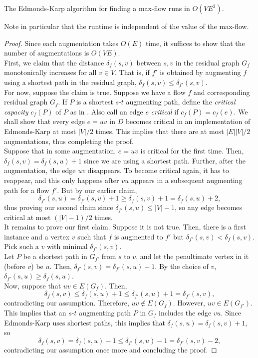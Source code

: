 			\begin{ftheo}
				The Edmonds-Karp algorithm for finding a max-flow runs in $O(VE^2)$.
			\end{ftheo}
			Note in particular that the runtime is independent of the value of the max-flow.
			\begin{proof}
				Since each augmentation takes $O(E)$ time, it suffices to show that the number of augmentations is $O(VE)$.\\
				First, we claim that the distance $\delta_f(s,v)$ between $s,v$ in the residual graph $G_f$ monotonically increases for all $v\in V$. That is, if $f'$ is obtained by augmenting $f$ using a shortest path in the residual graph, $\delta_f(s,v) \le \delta_{f'}(s,v)$.\\
				For now, suppose the claim is true. Suppose we have a flow $f$ and corresponding residual graph $G_f$. If $P$ is a shortest $s$-$t$ augmenting path, define the \emph{critical capacity} $c_f(P)$ of $P$ as in . Also call an edge $e$ \emph{critical} if $c_f(P) = c_f(e)$. We shall show that every edge $e = uv$ in $D$ becomes critical in an implementation of Edmonds-Karp at most $|V|/2$ times. This implies that there are at most $|E||V|/2$ augmentations, thus completing the proof.\\
				Suppose that in some augmentation, $e = uv$ is critical for the first time. Then, $\delta_f(s,v) = \delta_f(s,u) + 1$ since we are using a shortest path. Further, after the augmentation, the edge $uv$ disappears. To become critical again, it has to reappear, and this only happens after $vu$ appears in a subsequent augmenting path for a flow $f'$. But by our earlier claim,
				\[ \delta_{f'}(s,u) = \delta_{f'}(s,v) + 1 \ge \delta_f(s,v) + 1 = \delta_f(s,u) + 2, \]
				thus proving our second claim since $\delta_{f'}(s,u) \le |V|-1$, so any edge becomes critical at most $(|V|-1)/2$ times.\\

				It remains to prove our first claim. Suppose it is not true. Then, there is a first instance and a vertex $v$ such that $f$ is augmented to $f'$ but $\delta_{f'}(s,v) < \delta_{f}(s,v)$. Pick such a $v$ with minimal $\delta_{f'}(s,v)$.\\
				Let $P$ be a shortest path in $G_{f'}$ from $s$ to $v$, and let the penultimate vertex in it (before $v$) be $u$. Then, $\delta_{f'}(s,v) = \delta_{f'}(s,u) + 1$. By the choice of $v$, $\delta_{f'}(s,u) \ge \delta_{f}(s,u)$.\\
				Now, suppose that $uv \in E(G_f)$. Then,
				\[ \delta_f(s,v) \le \delta_f(s,u) + 1 \le \delta_{f'}(s,u) + 1 = \delta_{f'}(s,v), \]
				contradicting our assumption. Therefore, $uv \not\in E(G_f)$. However, $uv \in E(G_{f'})$. This implies that an $s$-$t$ augmenting path $P$ in $G_f$ includes the edge $vu$. Since Edmonds-Karp uses shortest paths, this implies that $\delta_f(s,u) = \delta_f(s,v) + 1$, so
				\[ \delta_f(s,v) = \delta_f(s,u) - 1 \le \delta_{f'}(s,u) - 1 = \delta_{f'}(s,v) - 2, \]
				contradicting our assumption once more and concluding the proof. 
			\end{proof}

